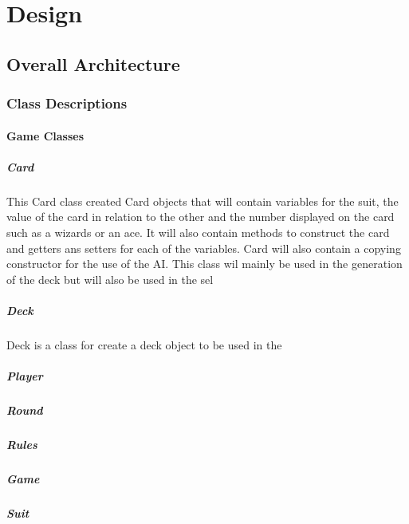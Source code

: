 \chapter{Design}

\section{Overall Architecture}

\subsection{Class Descriptions}
\subsubsection{Game Classes}
\paragraph{Card}
This Card class created Card objects that will contain variables for the suit, the value of the card in relation to the other and the number displayed on the card such as a wizards or an ace. It will also contain methods to construct the card and getters ans setters for each of the variables. Card will also contain a copying constructor for the use of the AI. This class wil mainly be used in the generation of the deck but will also be used in the sel
\paragraph{Deck}
Deck is a class for create a deck object to be used in the 
\paragraph{Player}
\paragraph{Round}
\paragraph{Rules}
\paragraph{Game}
\paragraph{Suit}
